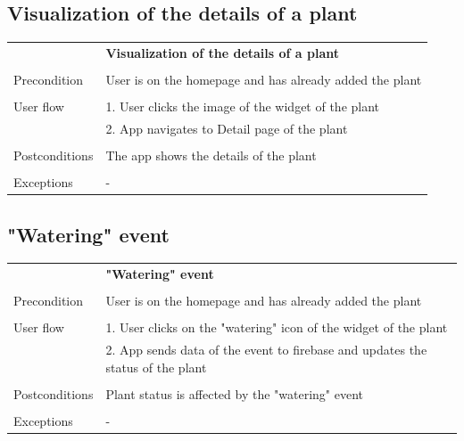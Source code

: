 \documentclass[10pt]{article}
\begin{document}
    \subsection{Visualization of the details of a plant}
    \begin{tabular}{ p{3cm}|p{8cm} }
     & \textbf{Visualization of the details of a plant} \\
     \\
     Precondition & User is on the homepage and has already added the plant \\ 
     \\
     User flow 
     & 1. User clicks the image of the widget of the plant \\
     & 2. App navigates to Detail page of the plant \\ 
     \\
     Postconditions & The app shows the details of the plant \\
     \\
     Exceptions & -\\
    \end{tabular}
    \newline
    \newline
    \newline
    \subsection{"Watering" event}
    \begin{tabular}{ p{3cm}|p{8cm} }
     & \textbf{"Watering" event} \\
     \\
     Precondition & User is on the homepage and has already added the plant \\ 
     \\
     User flow 
     & 1. User clicks on the "watering" icon of the widget of the plant \\
     & 2. App sends data of the event to firebase and updates the status of the plant \\ 
     \\
     Postconditions & Plant status is affected by the "watering" event \\
     \\
     Exceptions & -\\
    \end{tabular}
    \newline
    \newline
    \newline
\end{document}
